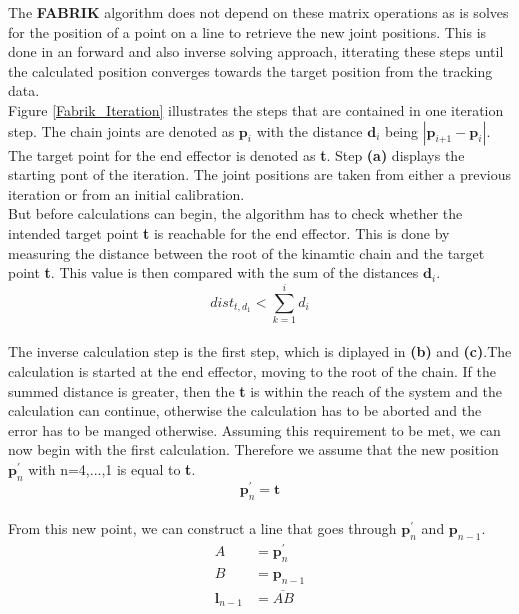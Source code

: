 The \textbf{FABRIK} algorithm does not depend on these matrix operations as is solves for the position of a point on a line to retrieve the new joint positions. This is done in an forward and also inverse solving approach, itterating these steps until the calculated position converges towards the target position from the tracking data.\\
Figure \ref{Fabrik_Iteration} illustrates the steps that are contained in one iteration step.
The chain joints are denoted as $\textbf{p}_{\textit{i}}$ with the distance $\textbf{d}_{i}$ being $|\textbf{p}_{\textit{i+1}}-\textbf{p}_{\textit{i}}|$. The target point for the end effector is denoted as \textbf{t}. Step \textbf{(a)} displays the starting pont of the iteration. The joint positions are taken from either a previous iteration or from an initial calibration. \\
But before calculations can begin, the algorithm has to check whether the intended target point \textbf{t} is reachable for the end effector. This is done by measuring the distance between the root of the kinamtic chain and the target point \textbf{t}. This value is then compared with the sum of the distances $\textbf{d}_{i}$.
\begin{equation}
 dist_{t,d_{1}}< \sum_{k=1}^{i}{d_{i}}
\end{equation}\\The inverse calculation step is the first step, which is diplayed in \textbf{(b)} and \textbf{(c)}.The calculation is started at the end effector, moving to the root of the chain. 
If the summed distance is greater, then the \textbf{t} is within the reach of the system and the calculation can continue, otherwise the calculation has to be aborted and the error has to be manged otherwise.
Assuming this requirement to be met, we can now begin with the first calculation. Therefore we assume that the new position $\textbf{p}_{n}^{'}$ with n=4,...,1 is equal to \textbf{t}.
\begin{equation}
 \textbf{p}_{n}^{'}=\textbf{t}
\end{equation}\\
From this new point, we can construct a line that goes through $\textbf{p}_{n}^{'}$ and $\textbf{p}_{n-1}$.
\begin{equation}
\begin{split}
A&=\textbf{p}_{n}^{'}\\
B&=\textbf{p}_{n-1}\\
\textbf{l}_{n-1}&=\overline{AB}\\
\end{split}
\end{equation}
